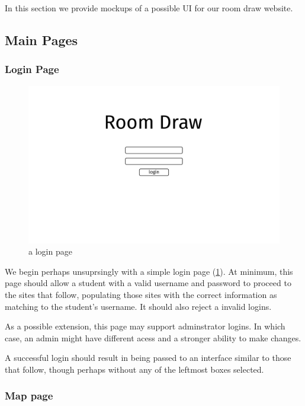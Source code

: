 In this section we provide mockups of a possible UI for our room draw website.

\subsection{Main Pages}
\subsubsection{Login Page}

\begin{figure} \centering
\includegraphics[scale=.15]{wireframe/login}
\caption{a login page}
\label{fig:wirelogin}
\end{figure}

We begin perhaps unsuprsingly with a simple login page (\cref{fig:wirelogin}).
At minimum, this page should allow a student with a valid username and password
to proceed to the sites that follow, populating those sites with the correct
information as matching to the student's username. It should also reject a
invalid logins.

As a possible extension, this page may support adminstrator logins. In which
case, an admin might have different acess and a stronger ability to make
changes.

A successful login should result in being passed to an interface similar to
those that follow, though perhaps without any of the leftmost boxes selected.

\subsubsection{Map page}

